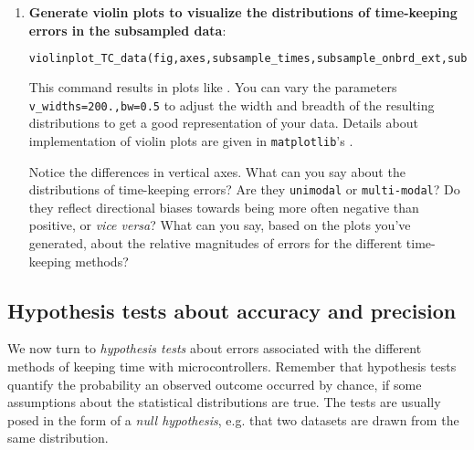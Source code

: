\begin{enumerate}
	\item \textbf{Generate violin plots to visualize the distributions of time-keeping errors in the subsampled data}:
\begin{lstlisting}[language=Python]
violinplot_TC_data(fig,axes,subsample_times,subsample_onbrd_ext,subsample_NTP_ext,subsample_NTP_onbrd,v_widths=200.,bw=0.5)
\end{lstlisting}
	\begin{marginfigure}[0.cm]
	\begin{center}
		\caption[Violin plots of time-keeping errors]{Violin plots of time-keeping errors, indicated by differences among three methods of keeping time.
		Top: Onboard \rtc minus  \rtc. Middle: \ntp minus  \rtc. Bottom: \ntp minus onboard \rtc. }
	\end{center}
\end{marginfigure}
	This command results in plots like .
	You can vary the parameters \lstinline{v_widths=200.,bw=0.5} to adjust the width and breadth of the resulting distributions to get a good representation of your data.
	Details about implementation of violin plots are given in \lstinline{matplotlib}'s .
	
	Notice the differences in vertical axes. 
	What can you say about the distributions of time-keeping errors?
	Are they \texttt{unimodal} or \texttt{multi-modal}?
	Do they reflect directional biases towards being more often negative than positive, or \textit{vice versa}?
	What can you say, based on the plots you've generated, about the relative magnitudes of errors for the different time-keeping methods?
	
\end{enumerate}

\subsection{Hypothesis tests about \rtc accuracy and precision}
We now turn to \emph{hypothesis tests} about errors associated with the different methods of keeping time with microcontrollers. 
Remember that hypothesis tests quantify the probability an observed outcome occurred by chance, if some assumptions about the statistical distributions are true.
The tests are usually posed in the form of a \emph{null hypothesis}, e.g. that two datasets are drawn from the same distribution. 


